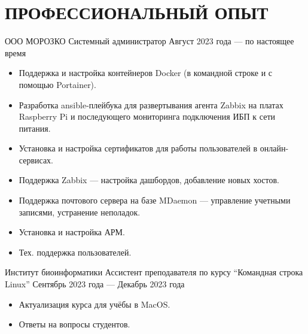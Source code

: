 \section{ПРОФЕССИОНАЛЬНЫЙ ОПЫТ}

    \job
        {ООО МОРОЗКО}
        {Системный администратор}
        {Август 2023 года --- по настоящее время}

        \begin{itemize}
            \setlength\itemsep{-.5em}
            \item Поддержка и настройка контейнеров Docker (в командной строке и с помощью Portainer).
            \item Разработка ansible-плейбука для развертывания агента Zabbix на платах Raspberry Pi и последующего мониторинга подключения ИБП к сети питания.
            \item Установка и настройка сертификатов для работы пользователей в онлайн-сервисах.
            \item Поддержка Zabbix — настройка дашбордов, добавление новых хостов.
            \item Поддержка почтового сервера на базе MDaemon — управление учетными записями, устранение неполадок.
            \item Установка и настройка АРМ.
            \item Тех. поддержка пользователей.
        \end{itemize}

        \vspace{-0.5em}
    
    \job
        {Институт биоинформатики}
        {Ассистент преподавателя по курсу “Командная строка Linux”}
        {Сентябрь 2023 года — Декабрь 2023 года}

        \begin{itemize}
            \setlength\itemsep{-.5em}
            \item Актуализация курса для учёбы в MacOS.
            \item Ответы на вопросы студентов.
        \end{itemize}
